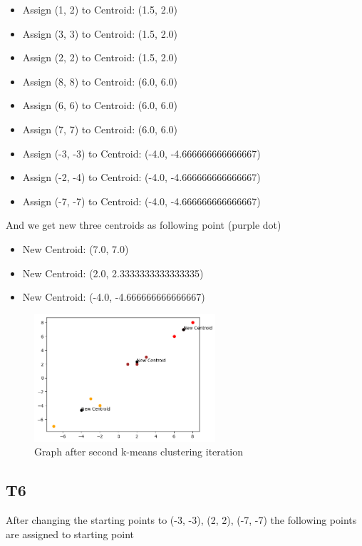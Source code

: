 \documentclass[12pt, a4paper]{article}
\begin{document}
\begin{itemize}
    \item Assign (1, 2) to Centroid: (1.5, 2.0)
    \item Assign (3, 3) to Centroid: (1.5, 2.0)
    \item Assign (2, 2) to Centroid: (1.5, 2.0)
    \item Assign (8, 8) to Centroid: (6.0, 6.0)
    \item Assign (6, 6) to Centroid: (6.0, 6.0)
    \item Assign (7, 7) to Centroid: (6.0, 6.0)
    \item Assign (-3, -3) to Centroid: (-4.0, -4.666666666666667)
    \item Assign (-2, -4) to Centroid: (-4.0, -4.666666666666667)
    \item Assign (-7, -7) to Centroid: (-4.0, -4.666666666666667)
\end{itemize}

And we get new three centroids as following point (purple dot)

\begin{itemize}
    \item New Centroid: (7.0, 7.0)
    \item New Centroid: (2.0, 2.3333333333333335)
    \item New Centroid: (-4.0, -4.666666666666667)
\end{itemize}

\begin{figure}[ht]
    \centering
    \includegraphics[width=0.6\textwidth]{images/T5_second_iteration.png}
    \caption{Graph after second k-means clustering iteration}
\end{figure}

\subsection{T6}

After changing the starting points to (-3, -3), (2, 2), (-7, -7) the following points are assigned to starting point
\end{document}
